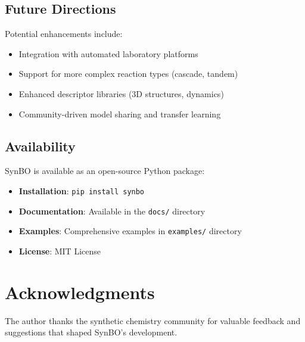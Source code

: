 \documentclass[12pt,a4paper]{article}
\begin{document}
\subsection{Future Directions}

Potential enhancements include:
\begin{itemize}
    \item Integration with automated laboratory platforms
    \item Support for more complex reaction types (cascade, tandem)
    \item Enhanced descriptor libraries (3D structures, dynamics)
    \item Community-driven model sharing and transfer learning
\end{itemize}

\subsection{Availability}

SynBO is available as an open-source Python package:
\begin{itemize}
    \item \textbf{Installation}: \texttt{pip install synbo}
    \item \textbf{Documentation}: Available in the \texttt{docs/} directory
    \item \textbf{Examples}: Comprehensive examples in \texttt{examples/} directory
    \item \textbf{License}: MIT License
\end{itemize}

\section*{Acknowledgments}

The author thanks the synthetic chemistry community for valuable feedback and suggestions that shaped SynBO's development.
\end{document}
